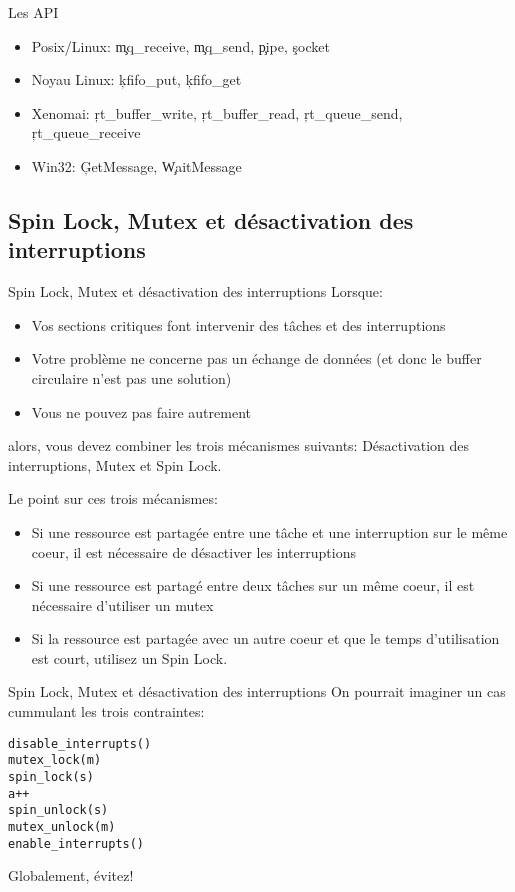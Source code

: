 \begin{frame}[fragile=singleslide]{Les API}
  \begin{itemize} 
  \item Posix/Linux: \c{mq_receive}, \c{mq_send}, \c{pipe}, \c{socket}
  \item Noyau Linux: \c{kfifo_put}, \c{kfifo_get}
  \item      Xenomai:     \c{rt_buffer_write},     \c{rt_buffer_read},
    \c{rt_queue_send}, \c{rt_queue_receive}
  \item Win32: \c{GetMessage}, \c{WaitMessage}
  \end{itemize} 
\end{frame} 


\subsection{Spin Lock, Mutex et désactivation des interruptions}

\begin{frame}[fragile]{Spin Lock, Mutex et désactivation des interruptions}
  Lorsque:
  \begin{itemize} 
  \item  Vos  sections critiques  font  intervenir  des  tâches et  des
    interruptions
  \item Votre problème ne concerne  pas un échange de données (et donc
    le buffer circulaire n'est pas une solution)
  \item Vous ne pouvez pas faire autrement
  \end{itemize} 
  alors,   vous  devez   combiner  les   trois   mécanismes  suivants:
  Désactivation des interruptions, Mutex et Spin Lock.

  Le point sur ces trois mécanismes:
  \begin{itemize} 
  \item  Si  une  ressource  est   partagée  entre  une  tâche  et  une
    interruption sur  le même coeur,  il est nécessaire  de désactiver
    les interruptions
  \item  Si une ressource  est partagé  entre deux  tâches sur  un même
    coeur, il est nécessaire d'utiliser un mutex
  \item Si  la ressource est  partagée avec un  autre coeur et  que le
    temps d'utilisation est court, utilisez un Spin Lock.
  \end{itemize}
\end{frame}

\begin{frame}[fragile]{Spin Lock, Mutex et désactivation des interruptions}
  On pourrait imaginer un cas cummulant les trois contraintes:
  \begin{lstlisting} 
disable_interrupts()
mutex_lock(m)
spin_lock(s)
a++
spin_unlock(s)
mutex_unlock(m)
enable_interrupts()
  \end{lstlisting} 
  Globalement, évitez!
\end{frame} 

